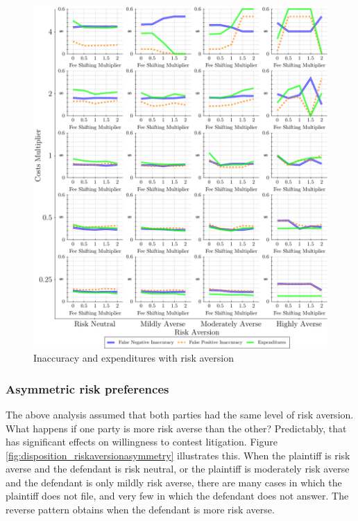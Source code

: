 \documentclass{article}
\begin{document}
\begin{figure}[h!]
\centering
\includegraphics[scale=0.50, trim={0in 0in 0in 0in}, clip]{../Figures/Accuracy and Expenditures Varying Risk Aversion.pdf}
\caption{Inaccuracy and expenditures with risk aversion}
\label{fig:accexp_riskaversion}
\end{figure}

\subsubsection{Asymmetric risk preferences}

The above analysis assumed that both parties had the same level of risk aversion. What happens if one party is more risk averse than the other? Predictably, that has significant effects on willingness to contest litigation. Figure \ref{fig:disposition_riskaversionasymmetry} illustrates this. When the plaintiff is risk averse and the defendant is risk neutral, or the plaintiff is moderately risk averse and the defendant is only mildly risk averse, there are many cases in which the plaintiff does not file, and very few in which the defendant does not answer. The reverse pattern obtains when the defendant is more risk averse. 
\end{document}
